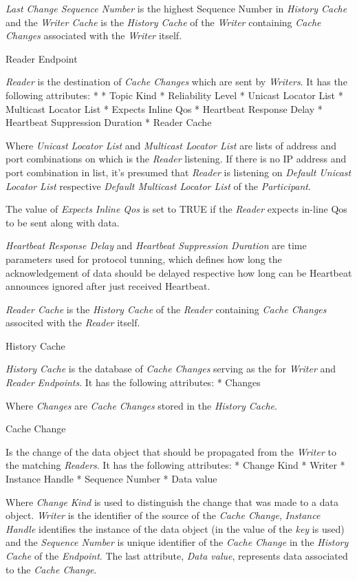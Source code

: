 {\em Last Change Sequence Number} is the highest Sequence Number in {\em History Cache} and the {\em Writer Cache} is the {\em History Cache} of the {\em Writer} containing {\em Cache Changes} associated with the {\em Writer} itself.

\secc Reader Endpoint

{\em Reader} is the destination of {\em Cache Changes} which are sent by {\em Writers}. It has the following attributes:
\begitems
* 
* Topic Kind
* Reliability Level
* Unicast Locator List
* Multicast Locator List
* Expects Inline Qos
* Heartbeat Response Delay
* Heartbeat Suppression Duration
* Reader Cache
\enditems

Where {\em Unicast Locator List} and {\em Multicast Locator List} are lists of  address and port combinations on which is the {\em Reader} listening. If there is no IP address and port combination in list, it's presumed that {\em Reader} is listening on {\em Default Unicast Locator List} respective {\em Default Multicast Locator List} of the {\em Participant}.

The value of {\em Expects Inline Qos} is set to TRUE if the {\em Reader} expects in-line Qos to be sent along with data.

{\em Heartbeat Response Delay} and {\em Heartbeat Suppression Duration} are time parameters used for protocol tunning, which defines how long the acknowledgement of data should be delayed respective how long can be Heartbeat announces ignored after just received Heartbeat.

{\em Reader Cache} is the {\em History Cache} of the {\em Reader} containing {\em Cache Changes} associted with the {\em Reader} itself.

\secc History Cache

{\em History Cache} is the database of {\em Cache Changes} serving as the  for {\em Writer} and {\em Reader} {\em Endpoints}. It has the following attributes:
\begitems
* Changes
\enditems

Where {\em Changes} are {\em Cache Changes} stored in the {\em History Cache}.

\secc Cache Change

Is the change of the data object that should be propagated from the {\em Writer} to the matching {\em Readers}. It has the following attributes:
\begitems
* Change Kind
* Writer 
* Instance Handle
* Sequence Number
* Data value
\enditems

Where {\em Change Kind} is used to distinguish the change that was made to a data object. {\em Writer } is the identifier of the source of the {\em Cache Change}, {\em Instance Handle} identifies the instance of the data object (in  the value of the {\em key} is used) and the {\em Sequence Number} is unique identifier of the {\em Cache Change} in the {\em History Cache} of the {\em Endpoint}. The last attribute, {\em Data value}, represents data associated to the {\em Cache Change}.


